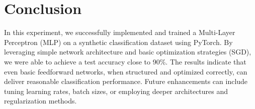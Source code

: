 \documentclass[a4paper, journal]{IEEEtran}
\begin{document}
\section{Conclusion}
In this experiment, we successfully implemented and trained a Multi-Layer Perceptron (MLP) on a synthetic classification dataset using PyTorch. By leveraging simple network architecture and basic optimization strategies (SGD), we were able to achieve a test accuracy close to 90\%. The results indicate that even basic feedforward networks, when structured and optimized correctly, can deliver reasonable classification performance. Future enhancements can include tuning learning rates, batch sizes, or employing deeper architectures and regularization methods.





\end{document}
